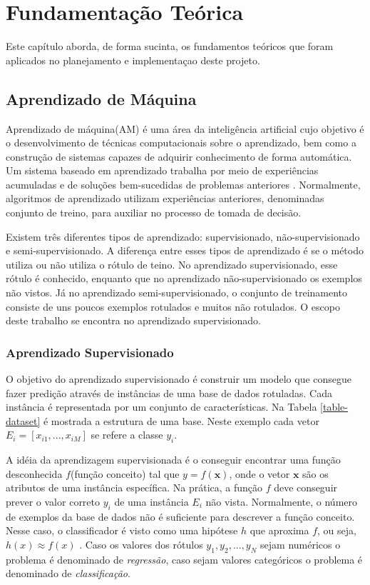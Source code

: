 \chapter{Fundamentação Teórica} \label{cap2}


Este capítulo aborda, de forma sucinta, os fundamentos teóricos que foram aplicados no planejamento e implementaçao deste projeto.



\section{Aprendizado de Máquina}

Aprendizado de máquina(AM) é uma área da inteligência artificial cujo objetivo é o desenvolvimento de técnicas computacionais sobre o aprendizado, bem como a construção de sistemas capazes de adquirir conhecimento de forma automática. Um sistema baseado em aprendizado trabalha por meio de experiências acumuladas e de soluções bem-sucedidas de problemas anteriores  \cite{monard2003}. Normalmente, algoritmos de aprendizado utilizam experiências anteriores, denominadas conjunto de treino, para auxiliar no processo de tomada de decisão.  

Existem três diferentes tipos de aprendizado: supervisionado, não-supervisionado e semi-supervisionado. A diferença entre esses tipos de aprendizado é se o método utiliza ou não utiliza o rótulo de teino. No aprendizado supervisionado, esse rótulo é conhecido, enquanto que no aprendizado não-supervisionado os exemplos não vistos. Já no aprendizado semi-supervisionado, o conjunto de treinamento consiste de uns poucos exemplos rotulados e muitos não rotulados\cite{chappelle2006}. O escopo deste trabalho se encontra no aprendizado supervisionado. 


\subsection{Aprendizado Supervisionado}
O objetivo do aprendizado supervisionado é construir um modelo que consegue fazer predição através de instâncias de uma base de dados rotuladas. Cada instância é representada por um conjunto de características. Na Tabela \ref{table-dataset} é mostrada a estrutura de uma base. Neste exemplo cada vetor $E_i = [x_{i1},...,x_{iM}]$ se refere a classe $y_i$.

A idéia da aprendizagem supervisionada é o conseguir encontrar uma função desconhecida $f$(função conceito) tal que $y=f(\mathbf{x})$, onde o vetor $\mathbf{x}$ são os atributos de uma instância específica. Na prática, a função $f$ deve conseguir prever o valor correto $y_i$ de uma instância $E_i$ não vista. Normalmente, o número de exemplos da base de dados não é suficiente para descrever a função conceito. Nesse caso, o classificador é visto como uma hipótese $h$ que aproxima $f$, ou seja, $h(x)\approx f(x)$ . Caso os valores dos rótulos $y_1,y_2,...,y_N$ sejam numéricos o problema é denominado de \textit{regressão}, caso sejam valores categóricos o problema é denominado de \textit{classificação}. 

